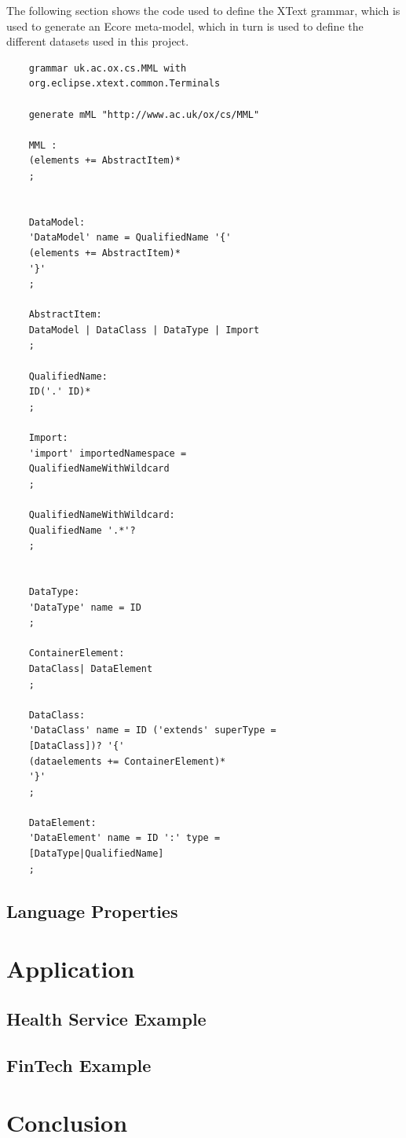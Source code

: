 \documentclass{llncs}
\begin{document}
The following section shows the code used to define the XText grammar, which is used to generate an Ecore meta-model, which in turn is used to define the different datasets used in this project.
\begin{small}
	\begin{verbatim}
	grammar uk.ac.ox.cs.MML with 
	org.eclipse.xtext.common.Terminals
	
	generate mML "http://www.ac.uk/ox/cs/MML"
	
	MML :
	(elements += AbstractItem)*
	;
	
	
	DataModel:
	'DataModel' name = QualifiedName '{'
	(elements += AbstractItem)*
	'}'
	;
	
	AbstractItem:
	DataModel | DataClass | DataType | Import
	;
	
	QualifiedName:
	ID('.' ID)*
	;
	
	Import:
	'import' importedNamespace = 
	QualifiedNameWithWildcard
	;
	
	QualifiedNameWithWildcard:
	QualifiedName '.*'?
	;
	
	
	DataType:
	'DataType' name = ID
	;
	
	ContainerElement:
	DataClass| DataElement
	;
	
	DataClass:
	'DataClass' name = ID ('extends' superType =
	[DataClass])? '{'
	(dataelements += ContainerElement)*
	'}'
	;
	
	DataElement:
	'DataElement' name = ID ':' type =  
	[DataType|QualifiedName]
	;
	\end{verbatim}
\end{small}



\subsection{Language Properties}


\section{Application}


\subsection{Health Service Example}
\subsection{FinTech Example}


\section{Conclusion}







\end{document}
